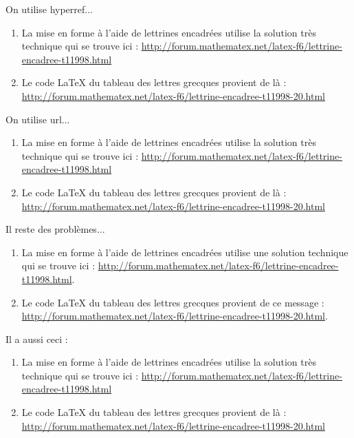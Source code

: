 \documentclass[10pt,a4paper]{article}
\begin{document}
On utilise hyperref...

\begin{enumerate}
	\item La mise en forme à l'aide de lettrines encadrées utilise la solution très technique qui se trouve ici : \hyperref[http://forum.mathematex.net/latex-f6/lettrine-encadree-t11998.html]{http://forum.mathematex.net/latex-f6/lettrine-encadree-t11998.html}

	\item Le code \LaTeX{} du tableau des lettres grecques provient de là : \hyperref[http://forum.mathematex.net/latex-f6/lettrine-encadree-t11998-20.html]{http://forum.mathematex.net/latex-f6/lettrine-encadree-t11998-20.html}
\end{enumerate}

On utilise url...

\begin{enumerate}
	\item La mise en forme à l'aide de lettrines encadrées utilise la solution très technique qui se trouve ici : \url{http://forum.mathematex.net/latex-f6/lettrine-encadree-t11998.html}

	\item Le code \LaTeX{} du tableau des lettres grecques provient de là : \url{http://forum.mathematex.net/latex-f6/lettrine-encadree-t11998-20.html}
\end{enumerate}

Il reste des problèmes...

\begin{enumerate}
	\item La mise en forme à l'aide de lettrines encadrées utilise une solution technique qui se trouve ici : \url{http://forum.mathematex.net/latex-f6/lettrine-encadree-t11998.html}.

	\item Le code \LaTeX{} du tableau des lettres grecques provient de ce message : \url{http://forum.mathematex.net/latex-f6/lettrine-encadree-t11998-20.html}.
\end{enumerate}

Il a aussi ceci :

\begin{enumerate}
	\item La mise en forme à l'aide de lettrines encadrées utilise la solution très technique qui se trouve ici : \href{http://forum.mathematex.net/latex-f6/lettrine-encadree-t11998.html}{http://forum.mathematex.net/latex-f6/lettrine-encadree-t11998.html}

	\item Le code \LaTeX{} du tableau des lettres grecques provient de là : \href{http://forum.mathematex.net/latex-f6/lettrine-encadree-t11998-20.html}{http://forum.mathematex.net/latex-f6/lettrine-encadree-t11998-20.html}
\end{enumerate}
\end{document}
